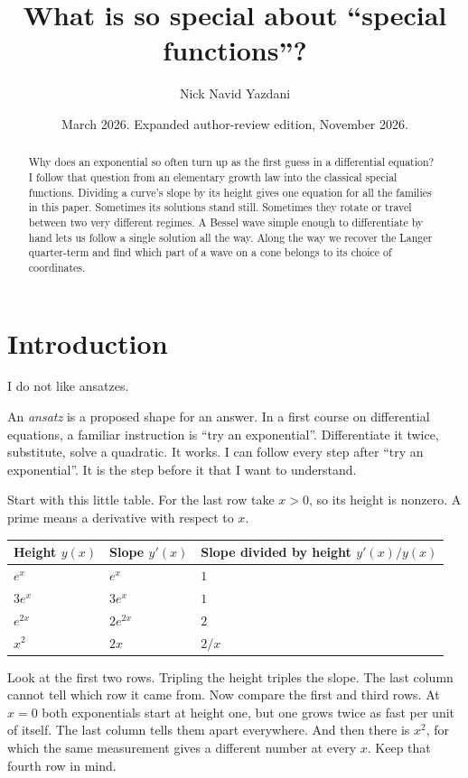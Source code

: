 \documentclass[11pt,a4paper]{amsart}
\title{What is so special about ``special functions''?}
\author{Nick Navid Yazdani}
\date{March 2026. Expanded author-review edition, November 2026.}
\theoremstyle{definition}
\theoremstyle{remark}
\begin{document}
\begin{abstract}
Why does an exponential so often turn up as the first guess in a differential equation? I follow that question from an elementary growth law into the classical special functions. Dividing a curve's slope by its height gives one equation for all the families in this paper. Sometimes its solutions stand still. Sometimes they rotate or travel between two very different regimes. A Bessel wave simple enough to differentiate by hand lets us follow a single solution all the way. Along the way we recover the Langer quarter-term and find which part of a wave on a cone belongs to its choice of coordinates.
\end{abstract}
\maketitle

\section{Introduction}
I do not like ansatzes.

An \emph{ansatz} is a proposed shape for an answer. In a first course on differential equations, a familiar instruction is “try an exponential”. Differentiate it twice, substitute, solve a quadratic. It works. I can follow every step after “try an exponential”. It is the step before it that I want to understand.

Start with this little table. For the last row take \(x>0\), so its height is nonzero. A prime means a derivative with respect to \(x\).
\begin{center}
\begin{tabular}{@{}lll@{}}
\toprule
Height \(y(x)\) & Slope \(y'(x)\) & Slope divided by height \(y'(x)/y(x)\)\\
\midrule
\(e^x\)    & \(e^x\)     & \(1\)\\
\(3e^x\)   & \(3e^x\)    & \(1\)\\
\(e^{2x}\) & \(2e^{2x}\) & \(2\)\\
\(x^2\)    & \(2x\)      & \(2/x\)\\
\bottomrule
\end{tabular}
\end{center}

Look at the first two rows. Tripling the height triples the slope. The last column cannot tell which row it came from. Now compare the first and third rows. At \(x=0\) both exponentials start at height one, but one grows twice as fast per unit of itself. The last column tells them apart everywhere. And then there is \(x^2\), for which the same measurement gives a different number at every \(x\). Keep that fourth row in mind.
\end{document}
